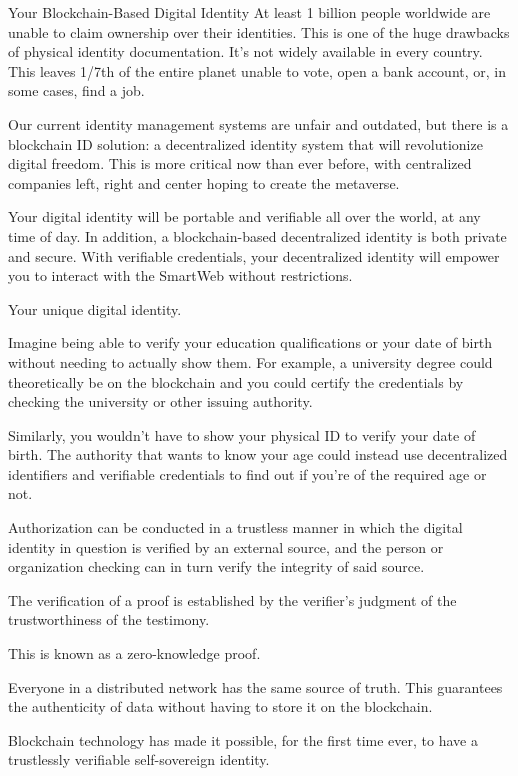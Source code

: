 Your Blockchain-Based Digital Identity
At least 1 billion people worldwide are unable to claim ownership over their identities. This is one of the huge drawbacks of physical identity documentation. It’s not widely available in every country. This leaves 1/7th of the entire planet unable to vote, open a bank account, or, in some cases, find a job. 

Our current identity management systems are unfair and outdated, but there is a blockchain ID solution: a decentralized identity system that will revolutionize digital freedom. This is more critical now than ever before, with centralized companies left, right and center hoping to create the metaverse.

Your digital identity will be portable and verifiable all over the world, at any time of day. In addition, a blockchain-based decentralized identity is both private and secure. With verifiable credentials, your decentralized identity will empower you to interact with the SmartWeb without restrictions.

Your unique digital identity.

Imagine being able to verify your education qualifications or your date of birth without needing to actually show them. For example, a university degree could theoretically be on the blockchain and you could certify the credentials by checking the university or other issuing authority. 

Similarly, you wouldn’t have to show your physical ID to verify your date of birth. The authority that wants to know your age could instead use decentralized identifiers and verifiable credentials to find out if you’re of the required age or not.

Authorization can be conducted in a trustless manner in which the digital identity in question is verified by an external source, and the person or organization checking can in turn verify the integrity of said source. 

The verification of a proof is established by the verifier’s judgment of the trustworthiness of the testimony.

This is known as a zero-knowledge proof.

Everyone in a distributed network has the same source of truth. This guarantees the authenticity of data without having to store it on the blockchain.

Blockchain technology has made it possible, for the first time ever, to have a trustlessly verifiable self-sovereign identity.

